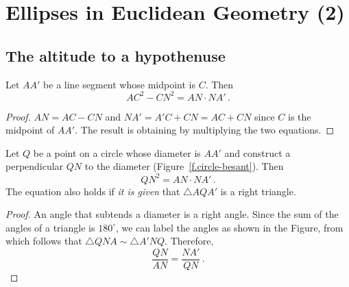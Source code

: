 

\section{Ellipses in Euclidean Geometry (2)}\label{s.besant}

\subsection{The altitude to a hypothenuse}

\begin{theorem}\label{thm.dividing}
Let $AA'$ be a line segment whose midpoint is $C$. Then 
\[
AC^2-CN^2=AN\cdot NA'\,.
\]
\end{theorem}

\begin{center}
\end{center}

\begin{proof}
$AN=AC-CN$ and $NA'=A'C+CN=AC+CN$ since $C$ is the midpoint of $AA'$. The result is obtaining by multiplying the two equations.
\end{proof}


\begin{theorem}\label{thm.alt-hypo}
Let $Q$ be a point on a circle whose diameter is $AA'$ and construct a perpendicular $QN$ to the diameter (Figure~\ref{f.circle-besant}). Then
\[
QN^2=AN\cdot NA'\,.
\]
The equation also holds if \emph{it is given} that $\triangle AQA'$ is a right triangle.
\end{theorem}

\begin{proof}
An angle that subtends a diameter is a right angle. Since the sum of the angles of a triangle is $180^\circ$, we can label the angles as shown in the Figure, from which follows that $\triangle QNA \sim\triangle A'NQ$. Therefore,
\[
\frac{QN}{AN} = \frac{NA'}{QN}\,.
\]
\hqed
\end{proof}

